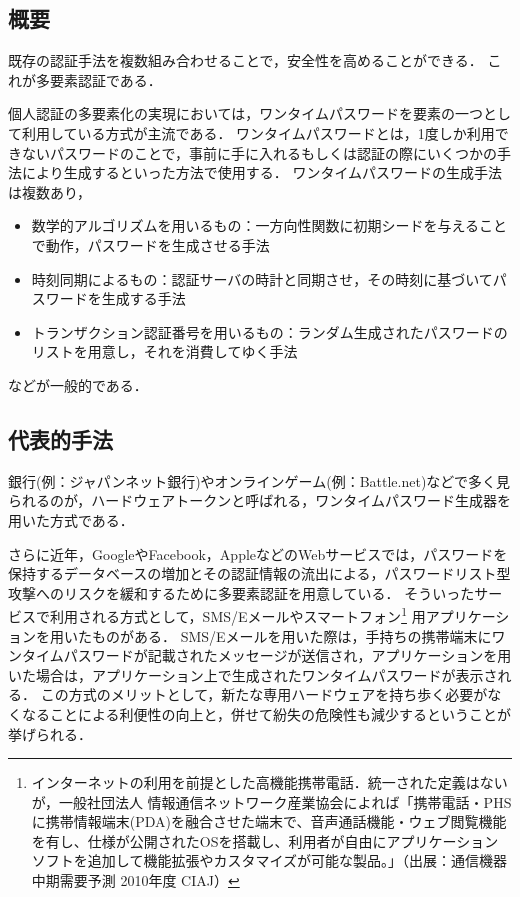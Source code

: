 \subsection{概要}
既存の認証手法を複数組み合わせることで，安全性を高めることができる．
これが多要素認証である．

個人認証の多要素化の実現においては，ワンタイムパスワードを要素の一つとして利用している方式が主流である\cite{DBLP:journals/corr/CristofaroDFN13}．
ワンタイムパスワードとは，1度しか利用できないパスワードのことで，事前に手に入れるもしくは認証の際にいくつかの手法により生成するといった方法で使用する．
ワンタイムパスワードの生成手法は複数あり，
\begin{itemize}
  \item 数学的アルゴリズムを用いるもの：一方向性関数に初期シードを与えることで動作，パスワードを生成させる手法
  \item 時刻同期によるもの：認証サーバの時計と同期させ，その時刻に基づいてパスワードを生成する手法
  \item トランザクション認証番号を用いるもの：ランダム生成されたパスワードのリストを用意し，それを消費してゆく手法
\end{itemize}
などが一般的である．

\subsection{代表的手法}
銀行(例：ジャパンネット銀行\cite{japannet2F})やオンラインゲーム(例：Battle.net\cite{battlenet2F})などで多く見られる\cite{DBLP:journals/corr/CristofaroDFN13}\cite{Yamane:2011:SOG:2021672.2021743}のが，ハードウェアトークンと呼ばれる，ワンタイムパスワード生成器を用いた方式である．

さらに近年，GoogleやFacebook，AppleなどのWebサービスでは，パスワードを保持するデータベースの増加とその認証情報の流出による，パスワードリスト型攻撃へのリスクを緩和するために多要素認証を用意している\cite{ipa07Outline}\cite{lifehacker2F}．
そういったサービスで利用される方式として，SMS/Eメールやスマートフォン\footnote{インターネットの利用を前提とした高機能携帯電話．統一された定義はないが，一般社団法人 情報通信ネットワーク産業協会によれば「携帯電話・PHSに携帯情報端末(PDA)を融合させた端末で、音声通話機能・ウェブ閲覧機能を有し、仕様が公開されたOSを搭載し、利用者が自由にアプリケーションソフトを追加して機能拡張やカスタマイズが可能な製品。」（出展：通信機器中期需要予測 2010年度 CIAJ）} 用アプリケーションを用いたものがある．
SMS/Eメールを用いた際は，手持ちの携帯端末にワンタイムパスワードが記載されたメッセージが送信され，アプリケーションを用いた場合は，アプリケーション上で生成されたワンタイムパスワードが表示される．
この方式のメリットとして，新たな専用ハードウェアを持ち歩く必要がなくなることによる利便性の向上と，併せて紛失の危険性も減少するということが挙げられる．

